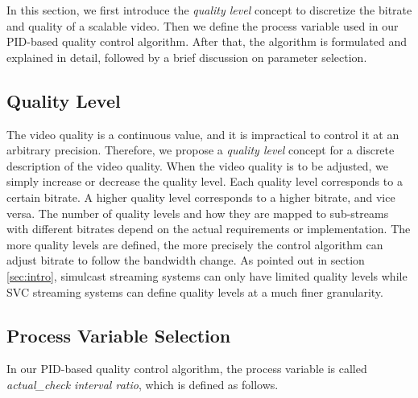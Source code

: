 \documentclass[journal]{IEEEtran}
\begin{document}
In this section, we first introduce the \textit{quality level} concept to discretize the bitrate and quality of a scalable video. Then we define the process variable used in our PID-based quality control algorithm. After that, the algorithm is formulated and explained in detail, followed by a brief discussion on parameter selection.

\subsection{Quality Level}
\label{subsec:quality-level}

The video quality is a continuous value, and it is impractical to control it at an arbitrary precision. Therefore, we propose a \textit{quality level} concept for a discrete description of the video quality. When the video quality is to be adjusted, we simply increase or decrease the quality level. Each quality level corresponds to a certain bitrate. A higher quality level corresponds to a higher bitrate, and vice versa. The number of quality levels and how they are mapped to sub-streams with different bitrates depend on the actual requirements or implementation. The more quality levels are defined, the more precisely the control algorithm can adjust bitrate to follow the bandwidth change. As pointed out in section \ref{sec:intro}, simulcast streaming systems can only have limited quality levels while SVC streaming systems can define quality levels at a much finer granularity.

\subsection{Process Variable Selection}
\label{subsec:process-variable}

In our PID-based quality control algorithm, the process variable is called \textit{actual\_check interval ratio}, which is defined as follows.
\end{document}
